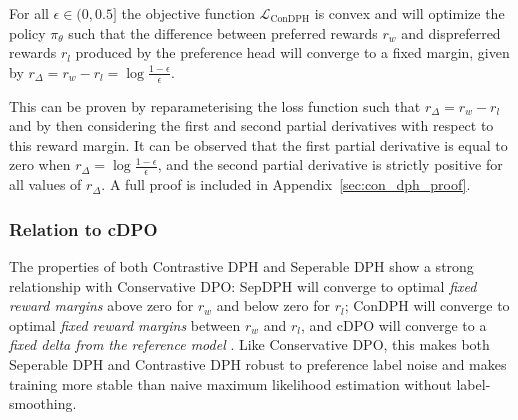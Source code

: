 
\begin{theorem} \label{thrm:con_dph_convergence}
For all $\epsilon \in (0,0.5]$ the objective function $\mathcal{L}_\text{ConDPH}$ is convex and will optimize the policy $\pi_\theta$ such that the difference between preferred rewards $r_w$ and dispreferred rewards $r_l$ produced by the preference head will converge to a fixed margin, given by $r_{\Delta}=r_w-r_l=\log\tfrac{1-\epsilon}{\epsilon}$. %
\end{theorem}

This can be proven by reparameterising the loss function such that $r_{\Delta}=r_w-r_l$ and by then considering the first and second partial derivatives with respect to this reward margin. It can be observed that the first partial derivative is equal to zero when $r_{\Delta}=\log\tfrac{1-\epsilon}{\epsilon}$, and the second partial derivative is strictly positive for all values of $r_{\Delta}$. A full proof is included in Appendix~\ref{sec:con_dph_proof}.

\subsubsection{Relation to cDPO}
The properties of both Contrastive DPH and Seperable DPH show a strong relationship with Conservative DPO: SepDPH will converge to optimal \textit{fixed reward margins} above zero for $r_w$ and below zero for $r_l$; ConDPH will converge to optimal \textit{fixed reward margins} between $r_w$ and $r_l$, and cDPO will converge to a \textit{fixed delta from the reference model} \cite{cdpo}. Like Conservative DPO, this makes both Seperable DPH and Contrastive DPH robust to preference label noise and makes training more stable than naive maximum likelihood estimation without label-smoothing.


